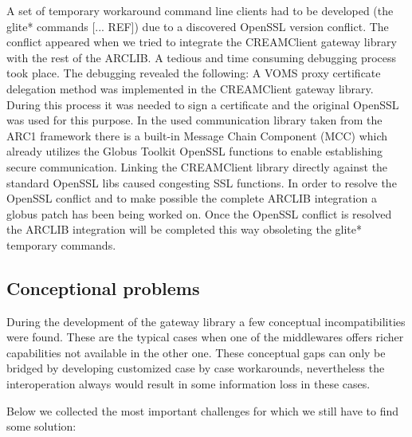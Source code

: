 \documentclass{article}
\begin{document}
A set of temporary workaround command line clients had to be developed (the glite* commands [... REF]) due to a discovered OpenSSL version conflict. The conflict appeared when we tried to integrate the CREAMClient gateway library with the rest of the ARCLIB. A tedious and time consuming debugging process took place. The debugging revealed the following:  A VOMS proxy certificate delegation method was implemented in the CREAMClient gateway library. During this process it was needed to sign a certificate and the original OpenSSL was used for this purpose. In the used communication library taken from the ARC1 framework there is a built-in Message Chain Component (MCC) which already utilizes the Globus Toolkit OpenSSL functions to enable establishing secure communication. Linking the CREAMClient library directly against the standard OpenSSL libs caused congesting SSL functions.  In order to resolve the OpenSSL conflict and to make possible the complete ARCLIB integration  a globus patch has been being worked on. Once the OpenSSL conflict is resolved the ARCLIB integration will be completed this way obsoleting the glite* temporary commands.\par
\subsection{Conceptional problems}
During the development of the gateway library a few conceptual incompatibilities were found.  These are the typical cases when one of the middlewares offers richer capabilities not available in the other one. These conceptual gaps can only be bridged by developing customized case by case workarounds, nevertheless  the interoperation always would result in some information loss in these cases.\par
Below we collected the most important challenges for which we still have to find some solution:
\end{document}
